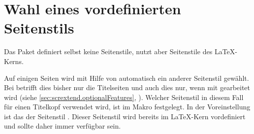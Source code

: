





\section{Wahl eines vordefinierten Seitenstils}

%
Das Paket  definiert selbst keine Seitenstile, nutzt aber
Seitenstile des \LaTeX-Kerns.


\begin{Declaration}
\end{Declaration}%
%
Auf einigen Seiten wird mit Hilfe von
 automatisch ein
anderer Seitenstil gewählt. Bei  betrifft dies bisher nur
die Titelseiten und auch dies nur, wenn mit
 gearbeitet wird (siehe
\autoref{sec:scrextend.optionalFeatures},
). Welcher Seitenstil in diesem
Fall für einen
Titelkopf%
 verwendet wird,
ist im Makro  festgelegt. In der Voreinstellung ist das
der Seitenstil . Dieser
Seitenstil wird bereits im \LaTeX-Kern vordefiniert und sollte daher immer
verfügbar sein.%
\EndIndexGroup

